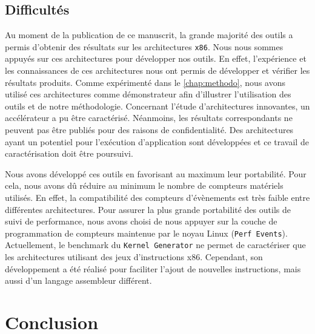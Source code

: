  
    \subsection{Difficultés}
        
        
        
        Au moment de la publication de ce manuscrit, la grande majorité des outils a permis d'obtenir des résultats sur les architectures \verb|x86|. Nous nous sommes appuyés sur ces architectures pour développer nos outils. En effet, l'expérience et les connaissances de ces architectures nous ont permis de développer et vérifier les résultats produits. Comme expérimenté dans le \autoref{chap:methodo}, nous avons utilisé ces architectures comme démonstrateur afin d'illustrer l'utilisation des outils et de notre méthodologie. Concernant l'étude d'architectures innovantes, un accélérateur a pu être caractérisé. Néanmoins, les résultats correspondants ne peuvent pas être publiés pour des raisons de confidentialité. Des architectures ayant un potentiel pour l'exécution d'application sont développées et ce travail de caractérisation doit être poursuivi. 
        
        Nous avons développé ces outils en favorisant au maximum leur portabilité. Pour cela, nous avons dû réduire au minimum le nombre de compteurs matériels utilisés. En effet, la compatibilité des compteurs d'évènements est très faible entre différentes architectures. Pour assurer la plus grande portabilité des outils de suivi de performance, nous avons choisi de nous appuyer sur la couche de programmation de compteurs maintenue par le noyau Linux (\verb|Perf Events|). Actuellement, le benchmark du \verb|Kernel Generator| ne permet de caractériser que les architectures utilisant des jeux d'instructions x86. Cependant, son développement a été réalisé pour faciliter l'ajout de nouvelles instructions, mais aussi d'un langage assembleur différent.


\section{Conclusion}
    
